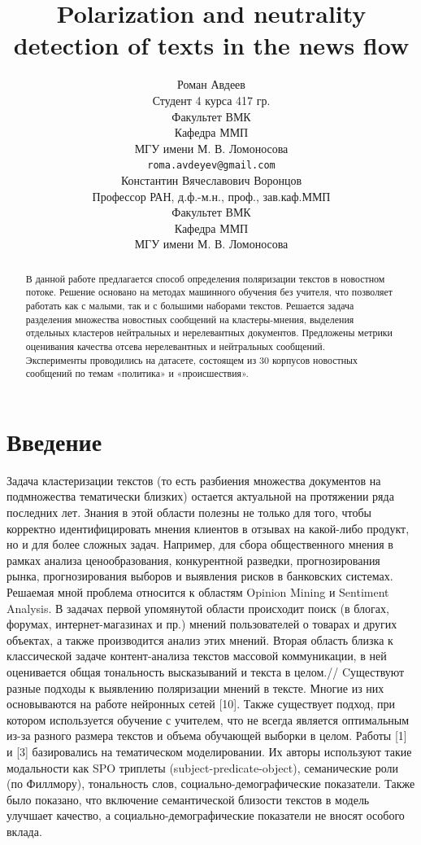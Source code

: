 \documentclass{article}
\title{Polarization and neutrality detection of texts in the news flow}
\author{Роман Авдеев \\
	Студент 4 курса 417 гр.\\
	Факультет ВМК\\
        Кафедра ММП\\
	МГУ имени М. В. Ломоносова \\
	\texttt{roma.avdeyev@gmail.com} \\
	\And
	Константин Вячеславович Воронцов\\
        Профессор РАН, д.ф.-м.н., проф., зав.каф.ММП\\
	Факультет ВМК\\
        Кафедра ММП\\
	МГУ имени М. В. Ломоносова \\
}
\date{}
\begin{document}
\maketitle

\begin{abstract}
	В данной работе предлагается способ определения поляризации текстов в новостном потоке. Решение основано на методах машинного обучения без учителя, что позволяет работать как с малыми, так и с большими наборами текстов. Решается задача разделения множества новостных сообщений на кластеры-мнения, выделения отдельных кластеров нейтральных и нерелевантных документов. Предложены метрики оценивания качества отсева нерелевантных и нейтральных сообщений.\\ Эксперименты проводились на датасете, состоящем из 30 корпусов новостных сообщений по темам «политика» и «происшествия».
\end{abstract}



\section{Введение}
Задача кластеризации текстов (то есть разбиения множества документов на подмножества тематически близких) остается актуальной на протяжении ряда последних лет. Знания в этой области полезны не только для того, чтобы корректно идентифицировать мнения клиентов в отзывах на какой-либо продукт, но и для более сложных задач. Например, для сбора общественного мнения в рамках анализа ценообразования, конкурентной разведки, прогнозирования рынка, прогнозирования выборов и выявления рисков в банковских системах. \\

Решаемая мной проблема относится к областям Opinion Mining и Sentiment Analysis. В задачах первой упомянутой области происходит поиск (в блогах, форумах, интернет-магазинах и пр.) мнений пользователей о товарах и других объектах, а также производится анализ этих мнений. Вторая область близка к классической задаче контент-анализа текстов массовой коммуникации, в ней оценивается общая тональность высказываний и текста в целом.//
Cуществуют разные подходы к выявлению поляризации мнений в тексте. Многие из них основываются на работе нейронных сетей [10]. Также существует подход, при котором используется обучение с учителем, что не всегда является оптимальным из-за разного размера текстов и объема обучающей выборки в целом. Работы [1] и [3] базировались на тематическом моделировании. Их авторы используют такие модальности как SPO триплеты (subject-predicate-object), семанические роли (по Филлмору), тональность слов, социально-демографические показатели. Также было показано, что включение семантической близости текстов в модель улучшает качество, а социально-демографические показатели не вносят особого вклада.\\
\end{document}
